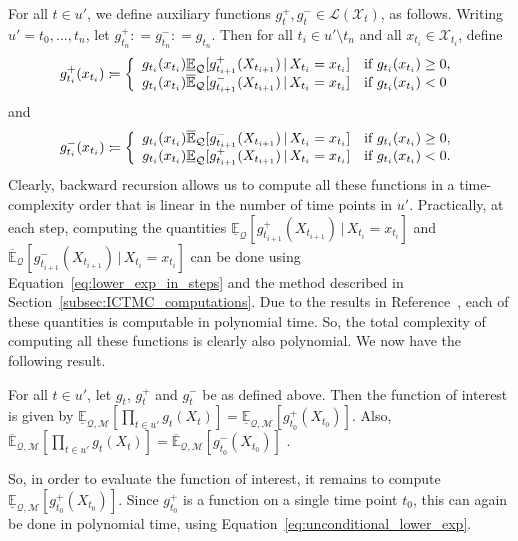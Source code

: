 \documentclass[twoside,11pt]{article}
\newcommand{\states}{\mathcal{X}}
\newcommand{\lexp}{\underline{\mathbb{E}}_{\rateset,\mathcal{M}}}
\newcommand{\uexp}{\overline{\mathbb{E}}_{\rateset,\mathcal{M}}}
\newcommand{\gambles}{\mathcal{L}}
\newcommand{\rateset}{\mathcal{Q}}
\newcommand{\coloneqq}{:\!=}
\begin{document}
For all $t\in u'$, we define auxiliary functions $g_{t}^+,g_{t}^-\in\gambles(\states_{t})$, as follows. Writing $u'=t_0,\ldots,t_{n}$, let $g_{t_{n}}^+\coloneqq g_{t_{n}}^-\coloneqq g_{t_{n}}$. Then for all $t_i\in u'\setminus t_n$ and all $x_{t_i}\in\states_{t_i}$, define
\begin{equation*}
g_{t_i}^+(x_{t_i}) \coloneqq \left\{\begin{array}{ll}
g_{t_i}(x_{t_i})\underline{\mathbb{E}}_\rateset[g_{t_{i+1}}^+(X_{t_{i+1}})\,\vert\, X_{t_i}=x_{t_i}] & \text{if $g_{t_i}(x_{t_i})\geq 0$,} \\
g_{t_i}(x_{t_i})\overline{\mathbb{E}}_\rateset[g_{t_{i+1}}^-(X_{t_{i+1}})\,\vert\, X_{t_i}=x_{t_i}] & \text{if $g_{t_i}(x_{t_i})<0$}
\end{array}\right.\vspace{-5pt}
\end{equation*}
and
\begin{equation*}
g_{t_i}^-(x_{t_i}) \coloneqq \left\{\begin{array}{ll}
g_{t_i}(x_{t_i})\overline{\mathbb{E}}_\rateset[g_{t_{i+1}}^-(X_{t_{i+1}})\,\vert\, X_{t_i}=x_{t_i}] & \text{if $g_{t_i}(x_{t_i})\geq 0$,} \\
g_{t_i}(x_{t_i})\underline{\mathbb{E}}_\rateset[g_{t_{i+1}}^+(X_{t_{i+1}})\,\vert\, X_{t_i}=x_{t_i}] & \text{if $g_{t_i}(x_{t_i})<0$.}
\end{array}\right.\vspace{5pt}
\end{equation*}
Clearly, backward recursion allows us to compute all these functions in a time-complexity order that is linear in the number of time points in $u'$. Practically, at each step, computing the quantities $\underline{\mathbb{E}}_\rateset[g_{t_{i+1}}^+(X_{t_{i+1}})\,\vert\, X_{t_i}=x_{t_i}]$ and $\overline{\mathbb{E}}_\rateset[g_{t_{i+1}}^-(X_{t_{i+1}})\,\vert\, X_{t_i}=x_{t_i}]$ can be done using Equation~\eqref{eq:lower_exp_in_steps} and the method described in Section~\ref{subsec:ICTMC_computations}. Due to the results in Reference~\citep{krak2016ictmc}, each of these quantities is computable in polynomial time. So, the total complexity of computing all these functions is clearly also polynomial. We now have the following result.
\begin{proposition}\label{prop:computing_product_funcs}
For all $t\in u'$, let $g_{t}$, $g_{t}^+$ and $g_{t}^-$ be as defined above. Then the function of interest is given by
$\lexp\left[\prod_{t\in u'}g_{t}(X_{t})\right] = \lexp\left[g_{t_0}^+(X_{t_0})\right]$. Also,
$\uexp\left[\prod_{t\in u'}g_{t}(X_{t})\right]=\uexp\left[g_{t_0}^-(X_{t_0})\right]$%
.
\end{proposition}
So, in order to evaluate the function of interest, it remains to compute $\lexp\left[g_{t_0}^+(X_{t_0})\right]$. Since $g_{t_0}^+$ is a function on a single time point $t_0$, this can again be done in polynomial time, using Equation~\eqref{eq:unconditional_lower_exp}.
\end{document}
